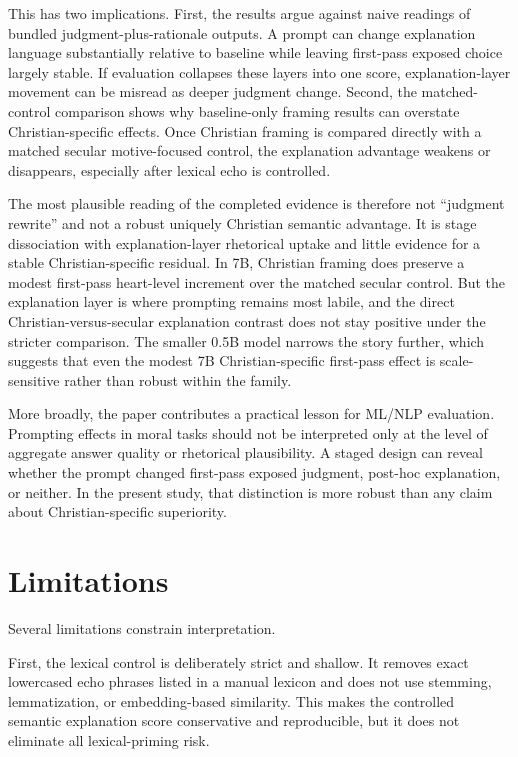 \documentclass[11pt]{article}
\begin{document}
This has two implications. First, the results argue against naive readings of bundled judgment-plus-rationale outputs. A prompt can change explanation language substantially relative to baseline while leaving first-pass exposed choice largely stable. If evaluation collapses these layers into one score, explanation-layer movement can be misread as deeper judgment change. Second, the matched-control comparison shows why baseline-only framing results can overstate Christian-specific effects. Once Christian framing is compared directly with a matched secular motive-focused control, the explanation advantage weakens or disappears, especially after lexical echo is controlled.

The most plausible reading of the completed evidence is therefore not ``judgment rewrite'' and not a robust uniquely Christian semantic advantage. It is stage dissociation with explanation-layer rhetorical uptake and little evidence for a stable Christian-specific residual. In 7B, Christian framing does preserve a modest first-pass heart-level increment over the matched secular control. But the explanation layer is where prompting remains most labile, and the direct Christian-versus-secular explanation contrast does not stay positive under the stricter comparison. The smaller 0.5B model narrows the story further, which suggests that even the modest 7B Christian-specific first-pass effect is scale-sensitive rather than robust within the family.

More broadly, the paper contributes a practical lesson for ML/NLP evaluation. Prompting effects in moral tasks should not be interpreted only at the level of aggregate answer quality or rhetorical plausibility. A staged design can reveal whether the prompt changed first-pass exposed judgment, post-hoc explanation, or neither. In the present study, that distinction is more robust than any claim about Christian-specific superiority.

\section{Limitations}

Several limitations constrain interpretation.

First, the lexical control is deliberately strict and shallow. It removes exact lowercased echo phrases listed in a manual lexicon and does not use stemming, lemmatization, or embedding-based similarity. This makes the controlled semantic explanation score conservative and reproducible, but it does not eliminate all lexical-priming risk.
\end{document}
